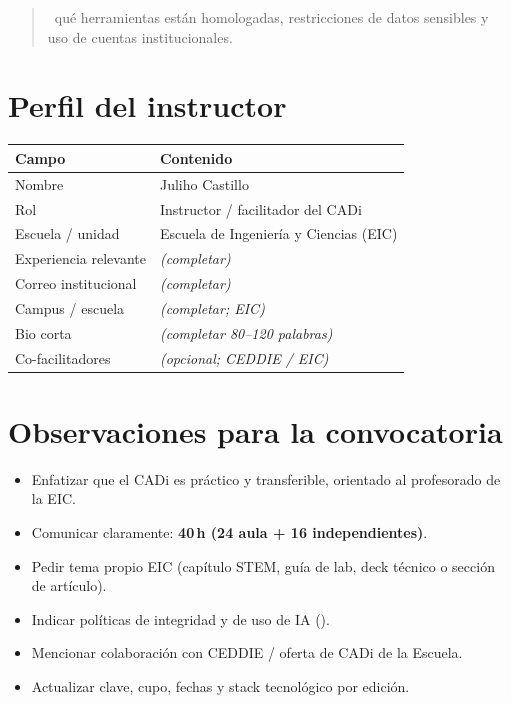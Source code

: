 \begin{quote}
\ceddie\ qué herramientas están homologadas, restricciones de datos sensibles y uso de cuentas institucionales.
\end{quote}

\section{Perfil del instructor}

\begin{tabularx}{\textwidth}{@{}lX@{}}
\toprule
Campo & Contenido \\
\midrule
Nombre & Juliho Castillo \\
Rol & Instructor / facilitador del CADi \\
Escuela / unidad & Escuela de Ingeniería y Ciencias (EIC) \\
Experiencia relevante & \textit{(completar)} \\
Correo institucional & \textit{(completar)} \\
Campus / escuela & \textit{(completar; EIC)} \\
Bio corta & \textit{(completar 80--120 palabras)} \\
Co-facilitadores & \textit{(opcional; CEDDIE / EIC)} \\
\bottomrule
\end{tabularx}

\section{Observaciones para la convocatoria}

\begin{itemize}
\item Enfatizar que el CADi es práctico y transferible, orientado al profesorado de la EIC.
\item Comunicar claramente: \textbf{40\,h (24 aula + 16 independientes)}.
\item Pedir tema propio EIC (capítulo STEM, guía de lab, deck técnico o sección de artículo).
\item Indicar políticas de integridad y de uso de IA (\ceddie).
\item Mencionar colaboración con CEDDIE / oferta de CADi de la Escuela.
\item Actualizar clave, cupo, fechas y stack tecnológico por edición.
\end{itemize}
